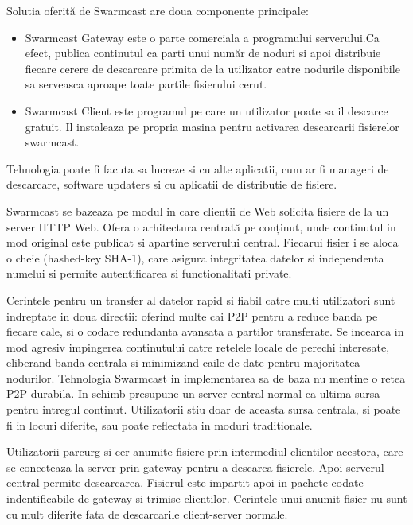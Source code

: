 Solutia oferită de Swarmcast are doua componente principale:

\begin{itemize}
  \item{Swarmcast Gateway este o parte comerciala a programului serverului.Ca
  efect, publica continutul ca parti unui număr de noduri si apoi distribuie
  fiecare cerere de descarcare primita de la utilizator catre nodurile
  disponibile sa serveasca aproape toate partile fisierului cerut.}
  \item{Swarmcast Client este programul pe care un utilizator poate sa il
  descarce gratuit. Il instaleaza pe propria masina pentru activarea
  descarcarii fisierelor swarmcast.}
\end{itemize}

Tehnologia poate fi facuta sa lucreze si cu alte aplicatii, cum ar fi manageri
de descarcare, software updaters si cu aplicatii de distributie de fisiere.

Swarmcast se bazeaza pe modul in care clientii de Web solicita fisiere de la
un server HTTP Web. Ofera o arhitectura centrată pe conținut, unde continutul
in mod original este publicat si apartine serverului central. Fiecarui fisier
i se aloca o cheie (hashed-key SHA-1), care asigura integritatea datelor si
independenta numelui si permite autentificarea si functionalitati private.

Cerintele pentru un transfer al datelor rapid si fiabil catre multi
utilizatori sunt indreptate in doua directii: oferind multe cai P2P pentru a
reduce banda pe fiecare cale, si o codare redundanta avansata a partilor
transferate. Se incearca in mod agresiv impingerea continutului catre retelele
locale de perechi interesate, eliberand banda centrala si minimizand caile de
date pentru majoritatea nodurilor. Tehnologia Swarmcast in implementarea sa de
baza nu mentine o retea P2P durabila. In schimb presupune un server central
normal ca ultima sursa pentru intregul continut. Utilizatorii stiu doar de
aceasta sursa centrala, si poate fi in locuri diferite, sau poate reflectata
in moduri traditionale.

Utilizatorii parcurg si cer anumite fisiere prin intermediul clientilor
acestora, care se conecteaza la server prin gateway pentru a descarca
fisierele. Apoi serverul central permite descarcarea. Fisierul este impartit
apoi in pachete codate indentificabile de gateway si trimise clientilor.
Cerintele unui anumit fisier nu sunt cu mult diferite fata de descarcarile
client-server normale.

